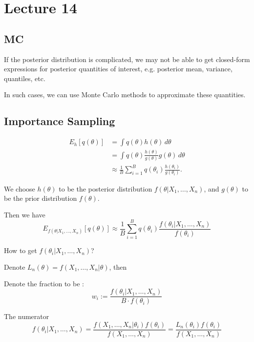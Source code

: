 
\section[Lecture 14 (Oct 28)-- {\it Posterior Distribution}]{Lecture 14}

\subsection{MC}

If the posterior distribution is complicated, we may not be able to get closed-form expressions for posterior quantities of interest, e.g. posterior mean, variance, quantiles, etc.

In such cases, we can use Monte Carlo methods to approximate these quantities.

\subsection{Importance Sampling} %

\[
\begin{aligned}
E_h[q(\theta)]
&= \int q(\theta) h(\theta) \, d\theta \\[6pt]
&= \int q(\theta) \frac{h(\theta)}{g(\theta)} g(\theta) \, d\theta \\[6pt]
&\approx \frac{1}{B} \sum_{i=1}^B q(\theta_i) \frac{h(\theta_i)}{g(\theta_i)}.
\end{aligned}
\]

We choose $h(\theta)$ to be the posterior distribution $f(\theta|X_1,\dots,X_n)$, and $g(\theta)$ to be the prior distribution $f(\theta)$.

Then we have
\[
E_{f(\theta|X_1,\dots,X_n)}[q(\theta)]
\approx \frac{1}{B} \sum_{i=1}^B q(\theta_i) \frac{f(\theta_i|X_1,\dots,X_n)}{f(\theta_i)}
\]

How to get $f(\theta_i|X_1,\dots,X_n)$?

Denote $L_n(\theta) = f(X_1,\dots,X_n|\theta)$, then

Denote the fraction to be :
\[
w_i := \dfrac{f(\theta_i | X_1,\dots,X_n)}{B \cdot f(\theta_i)} 
\]

The numerator \[
f(\theta_i | X_1,\dots,X_n) = \dfrac{f(X_1,\dots,X_n|\theta_i) f(\theta_i)}{f(X_1,\dots,X_n)} = \dfrac{L_n(\theta_i) f(\theta_i)}{f(X_1,\dots,X_n)}
\]

